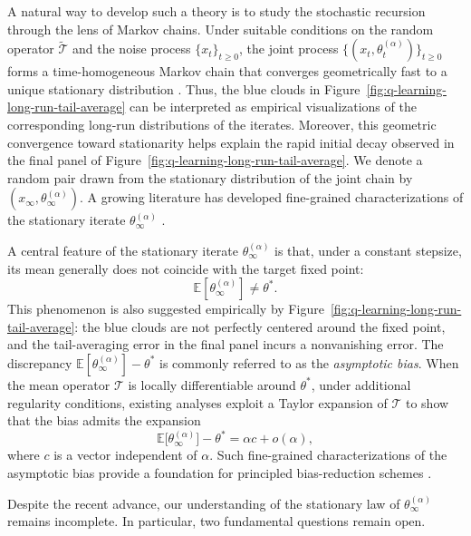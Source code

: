 \documentclass[11pt,letterpaper]{article}
\theoremstyle{plain}
\theoremstyle{definition}
\theoremstyle{remark}
\newcommand{\E}{\mathbb{E}}
\newcommand{\mT}{\mathcal{T}}
\newcommand{\tmT}{\widetilde{\mT}}
\begin{document}
A natural way to develop such a theory is to study the stochastic recursion
through the lens of Markov chains. Under suitable conditions on the random
operator $\tmT$ and the noise process $\{x_t\}_{t\ge 0}$, the joint process
$\{(x_t,\theta_t^{(\alpha)})\}_{t\ge 0}$ forms a time-homogeneous Markov chain
that converges geometrically fast to a unique stationary distribution
\citep{dieuleveut2020bridging, huo2023bias}. Thus, the blue clouds in
Figure~\ref{fig:q-learning-long-run-tail-average} can be interpreted as
empirical visualizations of the corresponding long-run distributions of the
iterates. Moreover, this geometric convergence toward stationarity helps explain the
rapid initial decay observed in the final panel of
Figure~\ref{fig:q-learning-long-run-tail-average}. We denote a random pair
drawn from the stationary distribution of the joint chain by
$(x_\infty,\theta_\infty^{(\alpha)})$. A growing literature has developed
fine-grained characterizations of the stationary iterate
$\theta_\infty^{(\alpha)}$
\citep{huo2023bias,zhang2024constant,huo2024collusion}.


A central feature of the stationary iterate $\theta_\infty^{(\alpha)}$ is
that, under a constant stepsize, its mean generally does not coincide with the
target fixed point:
\[
    \E[\theta_\infty^{(\alpha)}] \neq \theta^*.
\]
This phenomenon is also suggested empirically by
Figure~\ref{fig:q-learning-long-run-tail-average}: the blue clouds are not
perfectly centered around the fixed point, and the tail-averaging error in
the final panel incurs a nonvanishing error. The
discrepancy $\E[\theta_\infty^{(\alpha)}]-\theta^*$ is commonly referred to as the \emph{asymptotic bias}. When the mean operator
$\mT$ is locally differentiable around $\theta^*$, under additional regularity conditions, existing analyses exploit
a Taylor expansion of $\mT$ to show
that the bias admits the expansion
\begin{equation}\label{eq:bias-smooth}
    \E\big[\theta_\infty^{(\alpha)}\big]-\theta^*
    =
    \alpha c + o(\alpha),
\end{equation}
where $c$ is a vector independent of $\alpha$. Such fine-grained
characterizations of the asymptotic bias provide a foundation for principled
bias-reduction schemes 
\citep{dieuleveut2020bridging,huo2023bias,zhang2024constant,huo2024collusion}.

Despite the recent advance, our understanding of the stationary law of
$\theta_\infty^{(\alpha)}$ remains incomplete. In particular, two fundamental
questions remain open.
\end{document}
